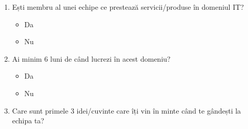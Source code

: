 \documentclass[a4paper, 12pt]{article}
\makeatletter
\newcommand*{\radiobutton}{\@ifstar{\radiobuttonON}{\radiobuttonOFF}}
\def\radiobuttonON{\raisebox{-1.5pt}{\stackinset{c}{}{c}{.35pt}{$\bullet$}{\scalebox{2}{$\circ$}}}}
\def\radiobuttonOFF{\raisebox{-1.5pt}{\scalebox{2}{$\circ$}}}
\makeatother
\begin{document}
	\begin{enumerate}
		\item Ești membru al unei echipe ce prestează servicii/produse în domeniul IT?
			\begin{itemize}
				\item[\radiobutton] Da
				\item[\radiobutton] Nu
			\end{itemize}
		\item Ai minim 6 luni de când lucrezi în acest domeniu?
			\begin{itemize}
				\item[\radiobutton] Da
				\item[\radiobutton] Nu
			\end{itemize}
		\item Care sunt primele 3 idei/cuvinte care îți vin în minte când te gândești la echipa ta?


\end{enumerate}
\end{document}
